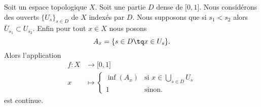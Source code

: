 \begin{lemma}       \label{LEMooWRLRooCdubfZ}
	Soit un espace topologique \( X\). Soit une partie \( D\) dense de \( \mathopen[ 0 , 1 \mathclose]\). Nous considérons des ouverts \( \{ U_s \}_{s\in D} \) de \( X\) indexés par \( D\). Nous supposons que si \( s_1<s_2\) alors \( \bar U_{s_1}\subset U_{s_2}\). Enfin pour tout \( x\in X\) nous posons
	\begin{equation}
		A_x=\{ s\in D\tq x\in U_s \}.
	\end{equation}
	Alors l'application
	\begin{equation}
		\begin{aligned}
			f\colon X & \to \mathopen[ 0 , 1 \mathclose]                       \\
			x         & \mapsto \begin{cases}
				                    \inf(A_x) & \text{si } x\in\bigcup_{s\in D}U_s \\
				                    1         & \text{sinon. }
			                    \end{cases}
		\end{aligned}
	\end{equation}
	est continue.
\end{lemma}

